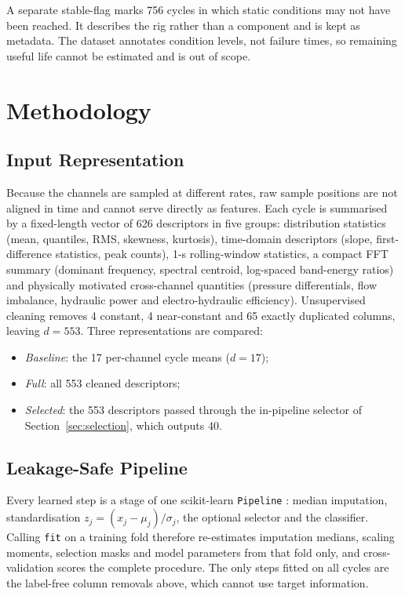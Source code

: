\documentclass[conference]{IEEEtran}
\begin{document}
A separate stable-flag marks 756 cycles in which static conditions may not
have been reached. It describes the rig rather than a component and is kept as
metadata. The dataset annotates condition levels, not failure times, so
remaining useful life cannot be estimated and is out of scope.

\section{Methodology}
\subsection{Input Representation}
Because the channels are sampled at different rates, raw sample positions are
not aligned in time and cannot serve directly as features. Each cycle is
summarised by a fixed-length vector of 626 descriptors in five groups:
distribution statistics (mean, quantiles, RMS, skewness, kurtosis),
time-domain descriptors (slope, first-difference statistics, peak counts),
1-s rolling-window statistics, a compact FFT summary (dominant frequency,
spectral centroid, log-spaced band-energy ratios) and physically motivated
cross-channel quantities (pressure differentials, flow imbalance, hydraulic
power and electro-hydraulic efficiency). Unsupervised cleaning removes 4
constant, 4 near-constant and 65 exactly duplicated columns, leaving
$d=553$. Three representations are compared:
\begin{itemize}
\item \textit{Baseline}: the 17 per-channel cycle means ($d=17$);
\item \textit{Full}: all 553 cleaned descriptors;
\item \textit{Selected}: the 553 descriptors passed through the in-pipeline
selector of Section~\ref{sec:selection}, which outputs 40.
\end{itemize}

\subsection{Leakage-Safe Pipeline}
Every learned step is a stage of one scikit-learn \texttt{Pipeline}
\cite{pedregosa2011}: median imputation, standardisation
$z_j=(x_j-\mu_j)/\sigma_j$, the optional selector and the classifier. Calling
\texttt{fit} on a training fold therefore re-estimates imputation medians,
scaling moments, selection masks and model parameters from that fold only, and
cross-validation scores the complete procedure. The only steps fitted on all
cycles are the label-free column removals above, which cannot use target
information.
\end{document}
